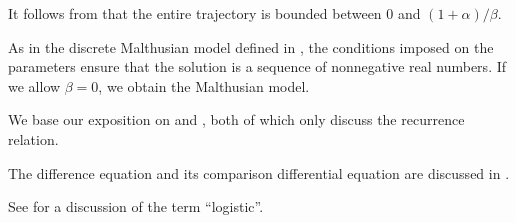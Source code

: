 \begin{comments}
  \item It follows from  that the entire trajectory is bounded between \( 0 \) and \( (1 + \alpha) / \beta \).

  \item As in the discrete Malthusian model defined in , the conditions imposed on the parameters ensure that the solution is a sequence of nonnegative real numbers. If we allow \( \beta = 0 \), we obtain the Malthusian model.

  \item We base our exposition on \cite[18]{Юмагулов2015ДинамическиеСистемы} and \cite[45]{EdelsteinKeshet2005MathematicalModelsInBiology}, both of which only discuss the recurrence relation.

  The difference equation and its comparison differential equation are discussed in \cite{MathSE:discrete_vs_continuous_logistic_model}.

  \item See  for a discussion of the term \enquote{logistic}.
\end{comments}

